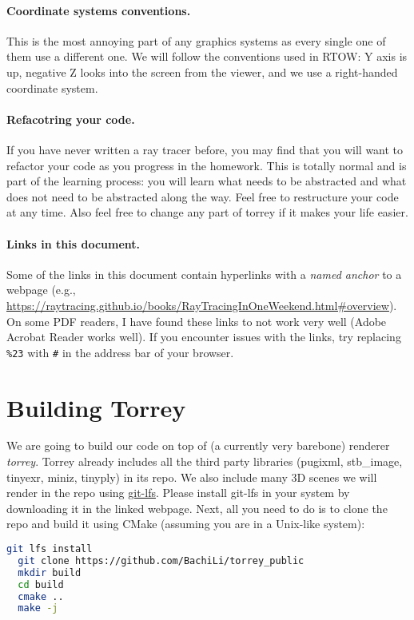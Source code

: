 \paragraph{Coordinate systems conventions.} This is the most annoying part of any graphics systems as every single one of them use a different one. We will follow the conventions used in RTOW: Y axis is up, negative Z looks into the screen from the viewer, and we use a right-handed coordinate system.

\paragraph{Refacotring your code.} If you have never written a ray tracer before, you may find that you will want to refactor your code as you progress in the homework. This is totally normal and is part of the learning process: you will learn what needs to be abstracted and what does not need to be abstracted along the way. Feel free to restructure your code at any time. Also feel free to change any part of torrey if it makes your life easier.

\paragraph{Links in this document.} Some of the links in this document contain hyperlinks with a \emph{named anchor} to a webpage (e.g., \url{https://raytracing.github.io/books/RayTracingInOneWeekend.html\#overview}). On some PDF readers, I have found these links to not work very well (Adobe Acrobat Reader works well). If you encounter issues with the links, try replacing \lstinline{%23} with \lstinline{#} in the address bar of your browser.

\section{Building Torrey}
We are going to build our code on top of (a currently very barebone) renderer \emph{torrey}. Torrey already includes all the third party libraries (pugixml, stb\_image, tinyexr, miniz, tinyply) in its repo.
We also include many 3D scenes we will render in the repo using \href{https://git-lfs.com/}{git-lfs}. Please install git-lfs in your system by downloading it in the linked webpage. Next, all you need to do is to clone the repo and build it using CMake (assuming you are in a Unix-like system):
\begin{lstlisting}[language=bash]
  git lfs install
  git clone https://github.com/BachiLi/torrey_public
  mkdir build
  cd build
  cmake ..
  make -j
\end{lstlisting}

